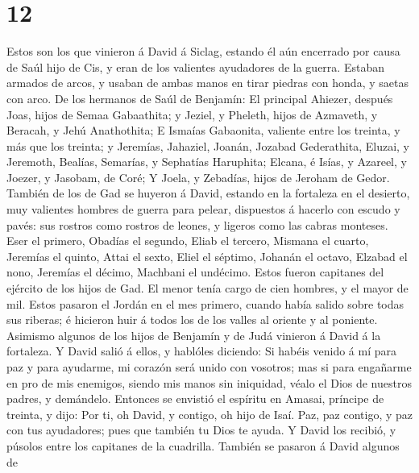 \hypertarget{section-11}{%
\section{12}\label{section-11}}

 Estos son los que vinieron á David á Siclag, estando él
aún encerrado por causa de Saúl hijo de Cis, y eran de los valientes
ayudadores de la guerra.  Estaban armados de arcos, y
usaban de ambas manos en tirar piedras con honda, y saetas con arco. De
los hermanos de Saúl de Benjamín:  El principal Ahiezer,
después Joas, hijos de Semaa Gabaathita; y Jeziel, y Pheleth, hijos de
Azmaveth, y Beracah, y Jehú Anathothita;  E Ismaías
Gabaonita, valiente entre los treinta, y más que los treinta; y
Jeremías, Jahaziel, Joanán, Jozabad Gederathita,  Eluzai,
y Jeremoth, Bealías, Semarías, y Sephatías Haruphita; 
Elcana, é Isías, y Azareel, y Joezer, y Jasobam, de Coré; 
Y Joela, y Zebadías, hijos de Jeroham de Gedor.  También
de los de Gad se huyeron á David, estando en la fortaleza en el
desierto, muy valientes hombres de guerra para pelear, dispuestos á
hacerlo con escudo y pavés: sus rostros como rostros de leones, y
ligeros como las cabras monteses.  Eser el primero,
Obadías el segundo, Eliab el tercero,  Mismana el cuarto,
Jeremías el quinto,  Attai el sexto, Eliel el séptimo,
 Johanán el octavo, Elzabad el nono, 
Jeremías el décimo, Machbani el undécimo.  Estos fueron
capitanes del ejército de los hijos de Gad. El menor tenía cargo de cien
hombres, y el mayor de mil.  Estos pasaron el Jordán en
el mes primero, cuando había salido sobre todas sus riberas; é hicieron
huir á todos los de los valles al oriente y al poniente. 
Asimismo algunos de los hijos de Benjamín y de Judá vinieron á David á
la fortaleza.  Y David salió á ellos, y hablóles
diciendo: Si habéis venido á mí para paz y para ayudarme, mi corazón
será unido con vosotros; mas si para engañarme en pro de mis enemigos,
siendo mis manos sin iniquidad, véalo el Dios de nuestros padres, y
demándelo.  Entonces se envistió el espíritu en Amasai,
príncipe de treinta, y dijo: Por ti, oh David, y contigo, oh hijo de
Isaí. Paz, paz contigo, y paz con tus ayudadores; pues que también tu
Dios te ayuda. Y David los recibió, y púsolos entre los capitanes de la
cuadrilla.  También se pasaron á David algunos de
